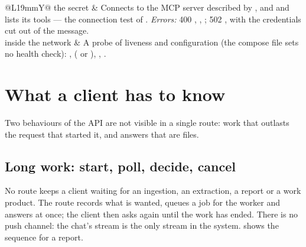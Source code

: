 \begin{xltabular}{\textwidth}{@{}L{19mm}Y@{}}
the secret & Connects to the MCP server described by ,  and
   and lists its tools --- the connection test of
  . \emph{Errors:} 400 ,
  , ; 502 , with the
  credentials cut out of the message. \\
\addlinespace
{}
inside the network & A probe of liveness and configuration (the compose file sets no health check):
  ,  ( or ), ,
  . \\
\end{xltabular}


\section{What a client has to know}\label{sec:api:client}

Two behaviours of the API are not visible in a single route: work that outlasts the request
that started it, and answers that are files.

\subsection{Long work: start, poll, decide, cancel}\label{sec:api:polling}

No route keeps a client waiting for an ingestion, an extraction, a report or a work product.
The route records what is wanted, queues a job for the worker and answers at once; the client
then asks again until the work has ended. There is no push channel: the chat's stream is the
only stream in the system.  shows the sequence for a report.

